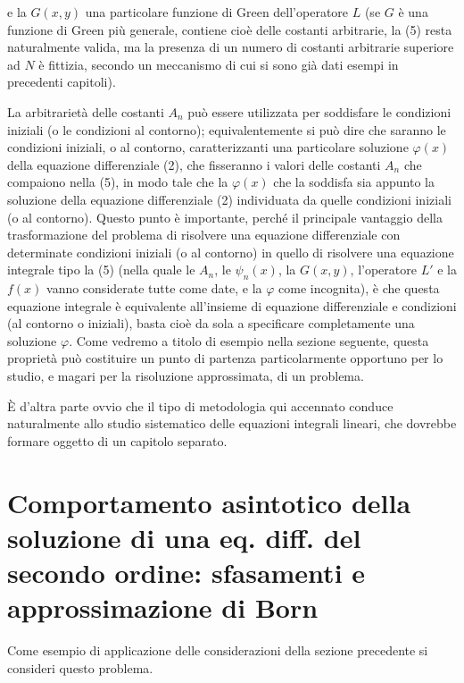 \documentclass[11pt, a4paper]{book}
\numberwithin{equation}{section}
\begin{document}

e la $G(x,y)$ una particolare funzione di Green dell'operatore $L$ (se $G$ è una funzione di Green più generale, contiene cioè delle costanti arbitrarie, la (5) resta naturalmente valida, ma la presenza di un numero di costanti arbitrarie superiore ad $N$ è fittizia, secondo un meccanismo di cui si sono già dati esempi in precedenti capitoli).

La arbitrarietà delle costanti $A_n$ può essere utilizzata per soddisfare le condizioni iniziali (o le condizioni al contorno); equivalentemente si può dire che saranno le condizioni iniziali, o al contorno, caratterizzanti una particolare soluzione $\varphi(x)$ della equazione differenziale (2), che fisseranno i valori delle costanti $A_n$ che compaiono nella (5), in modo tale che la $\varphi(x)$ che la soddisfa sia appunto la soluzione della equazione differenziale (2) individuata da quelle condizioni iniziali (o al contorno). Questo punto è importante, perché il principale vantaggio della trasformazione del problema di risolvere una equazione differenziale con determinate condizioni iniziali (o al contorno) in quello di risolvere una equazione integrale tipo la (5) (nella quale le $A_n$, le $\psi_n(x)$, la $G(x,y)$, l'operatore $L'$ e la $f(x)$ vanno considerate tutte come date, e la $\varphi$ come incognita), è che questa equazione integrale è equivalente all'insieme di equazione differenziale e condizioni (al contorno o iniziali), basta cioè da sola a specificare completamente una soluzione $\varphi$. Come vedremo a titolo di esempio nella sezione seguente, questa proprietà può costituire un punto di partenza particolarmente opportuno per lo studio, e magari per la risoluzione approssimata, di un problema.

È d'altra parte ovvio che il tipo di metodologia qui accennato conduce naturalmente allo studio sistematico delle equazioni integrali lineari, che dovrebbe formare oggetto di un capitolo separato.


\section{Comportamento asintotico della soluzione di una eq. diff. del secondo ordine: sfasamenti e approssimazione di Born}

Come esempio di applicazione delle considerazioni della sezione precedente si consideri questo problema.
\end{document}
